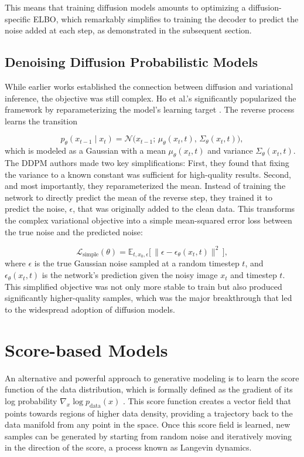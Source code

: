 This means that training diffusion models amounts to optimizing a diffusion-specific ELBO, which remarkably simplifies to training the decoder to predict the noise added at each step, as demonstrated in the subsequent section.

\subsection{Denoising Diffusion Probabilistic Models}
While earlier works established the connection between diffusion and variational inference, the objective was still complex. Ho et al.’s significantly popularized the framework by reparameterizing the model’s learning target \cite{hoDenoisingDiffusionProbabilistic2020a}. The reverse process learns the transition

\begin{equation}
	p_\theta(x_{t-1} \mid x_t) = \mathcal{N}\!\big(x_{t-1}; \, \mu_\theta(x_t, t), \, \Sigma_\theta(x_t, t)\big),
\end{equation}
which is modeled as a Gaussian with a mean $\mu_\theta(x_t, t)$ and variance $\Sigma_\theta(x_t, t)$. The DDPM authors made two key simplifications:
First, they found that fixing the variance to a known constant was sufficient for high-quality results. Second, and most importantly, they reparameterized the mean. Instead of training the network to directly predict the mean of the reverse step, they trained it to predict the noise, $\epsilon$, that was originally added to the clean data.
This transforms the complex variational objective into a simple mean-squared error loss between the true noise and the predicted noise:

\begin{equation}
	\mathcal{L}_{\text{simple}}(\theta)
	= \mathbb{E}_{t, x_0, \epsilon} \big[ \, \lVert \epsilon - \epsilon_\theta(x_t, t) \rVert^2 \, \big],
\end{equation}
where $\epsilon$ is the true Gaussian noise sampled at a random timestep $t$, and $\epsilon_\theta(x_t, t)$ is the network’s prediction given the noisy image $x_t$ and timestep $t$. This simplified objective was not only more stable to train but also produced significantly higher-quality samples, which was the major breakthrough that led to the widespread adoption of diffusion models.

\section{Score-based Models}
\label{sec:score_based}
An alternative and powerful approach to generative modeling is to learn the score function of the data distribution, which is formally defined as the gradient of its log probability $ \nabla_x \log p_{\text{data}}(x)$ \cite{vincentConnectionScoreMatching2011a}.
This score function creates a vector field that points towards regions of higher data density, providing a trajectory back to the data manifold from any point in the space. Once this score field is learned, new samples can be generated by starting from random noise and iteratively moving in the direction of the score, a process known as Langevin dynamics.

